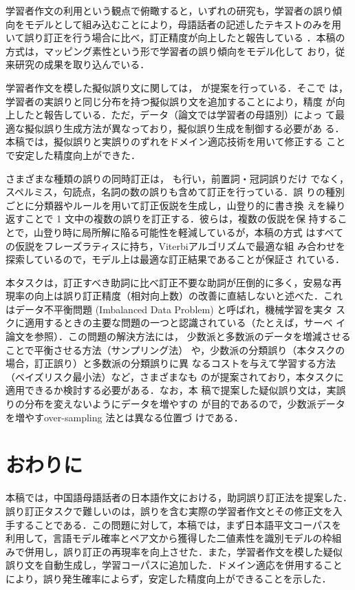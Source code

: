 \documentclass[japanese]{jnlp_1.4}
\begin{document}
学習者作文の利用という観点で俯瞰すると，いずれの研究も，学習者の誤り傾
向をモデルとして組み込むことにより，母語話者の記述したテキストのみを用
いて誤り訂正を行う場合に比べ，訂正精度が向上したと報告している
．本稿の方式は，マッピング素性という形で学習者の誤り傾向をモデル化して
おり，従来研究の成果を取り込んでいる．

学習者作文を模した擬似誤り文に関しては，
が提案を行っている．そこで
は，学習者の実誤りと同じ分布を持つ擬似誤り文を追加することにより，精度
が向上したと報告している．ただ，データ（論文では学習者の母語別）によっ
て最適な擬似誤り生成方法が異なっており，擬似誤り生成を制御する必要があ
る．本稿では，擬似誤りと実誤りのずれをドメイン適応技術を用いて修正する
ことで安定した精度向上ができた．

さまざまな種類の誤りの同時訂正は，
も行い，前置詞・冠詞誤りだけ
でなく，スペルミス，句読点，名詞の数の誤りも含めて訂正を行っている．誤
りの種別ごとに分類器やルールを用いて訂正仮説を生成し，山登り的に書き換
えを繰り返すことで 1 文中の複数の誤りを訂正する．彼らは，複数の仮説を保
持することで，山登り時に局所解に陥る可能性を軽減しているが，本稿の方式
はすべての仮説をフレーズラティスに持ち，Viterbiアルゴリズムで最適な組
み合わせを探索しているので，モデル上は最適な訂正結果であることが保証さ
れている．

本タスクは，訂正すべき助詞に比べ訂正不要な助詞が圧倒的に多く，安易な再
現率の向上は誤り訂正精度（相対向上数）の改善に直結しないと述べた．これ
はデータ不平衡問題 (Imbalanced Data Problem) と呼ばれ，機械学習を実タ
スクに適用するときの主要な問題の一つと認識されている（たとえば，サーベ
イ論文を参照）．この問題の解決方法には，
少数派と多数派のデータを増減させることで平衡させる方法（サンプリング法）
や，少数派の分類誤り（本タスクの場合，訂正誤り）と多数派の分類誤りに異
なるコストを与えて学習する方法（ベイズリスク最小法）など，さまざまなも
のが提案されており，本タスクに適用できるか検討する必要がある．なお，本
稿で提案した疑似誤り文は，実誤りの分布を変えないようにデータを増やすの
が目的であるので，少数派データを増やすover-sampling 法とは異なる位置づ
けである．


\section{おわりに}
\label{sec-conclusion}

本稿では，中国語母語話者の日本語作文における，助詞誤り訂正法を提案した．
誤り訂正タスクで難しいのは，誤りを含む実際の学習者作文とその修正文を入
手することである．この問題に対して，本稿では，まず日本語平文コーパスを
利用して，言語モデル確率とペア文から獲得した二値素性を識別モデルの枠組
みで併用し，誤り訂正の再現率を向上させた．また，学習者作文を模した疑似
誤り文を自動生成し，学習コーパスに追加した．ドメイン適応を併用すること
により，誤り発生確率によらず，安定した精度向上ができることを示した．
\end{document}
